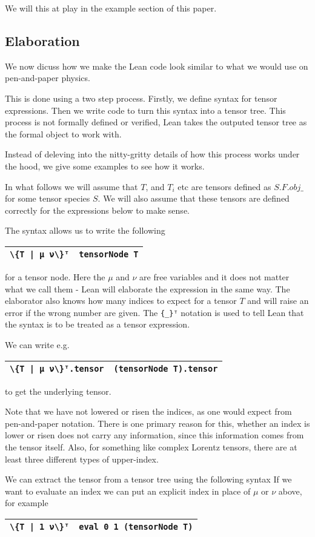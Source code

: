 \documentclass[a4paper, 11pt]{article}
\newcommand{\syntaxElab}[2]{ 
  \arrayrulecolor{mycolor}
  \begin{center}
    \begin{tabular}{|p{1.7in} | p{4in}|}
    \hline
    \hfill {#1} & {#2} \\
    \hline
    \end{tabular}
    \end{center}
  \arrayrulecolor{black}
}
\begin{document}
We will this at play in the example section of this paper.


\subsection{Elaboration} \label{sec:elaboration}

We now dicuss how we make the Lean code look similar to what we would use on pen-and-paper physics. 

This is done using a two step process. Firstly, we define syntax for tensor expressions. 
Then we write code to turn this syntax into a tensor tree. This process is not formally defined or 
verified, Lean takes the outputed tensor tree as the formal object to work with.

Instead of deleving into the nitty-gritty details of how this process works under the hood, 
we give some examples to see how it works. 

In what follows we will assume that $T$, and $T_i$ etc are tensors defined as $S.F.obj \_$ for 
some tensor species $S$. We will also assume that these tensors are defined correctly for the expressions below 
to make sense.

The syntax allows us to write the following 
\syntaxElab{\lstinline!\{T | μ ν\}ᵀ!}{{\lstinline!tensorNode T!}}
for a tensor node. Here the $\mu$ and $\nu$ are free variables and it does not 
matter what we call them - Lean will elaborate the expression in the same way.
The elaborator also knows how many indices to expect for a tensor $T$ and will raise an error if
the wrong number are given. The \lstinline|{_}ᵀ| notation is used to tell Lean that the syntax
is to be treated as a tensor expression. 

We can write e.g. 
\syntaxElab{\lstinline!\{T | μ ν\}ᵀ.tensor!}{{\lstinline!(tensorNode T).tensor!}}
to get the underlying tensor.

Note that we have not lowered or risen the indices, as one would expect from pen-and-paper notation.
There is one primary reason for this, whether an index is lower or risen does not carry any information, 
since this information comes from the tensor itself. Also, for something like complex Lorentz tensors, 
there are at least three different types of upper-index. 

We can extract the tensor from a tensor tree using the following syntax
If we want to evaluate an index we can put an explicit index in place of $\mu$ or $\nu$ above, 
for example
\syntaxElab{\lstinline!\{T | 1 ν\}ᵀ!}{\lstinline!eval 0 1 (tensorNode T)!}
\end{document}
